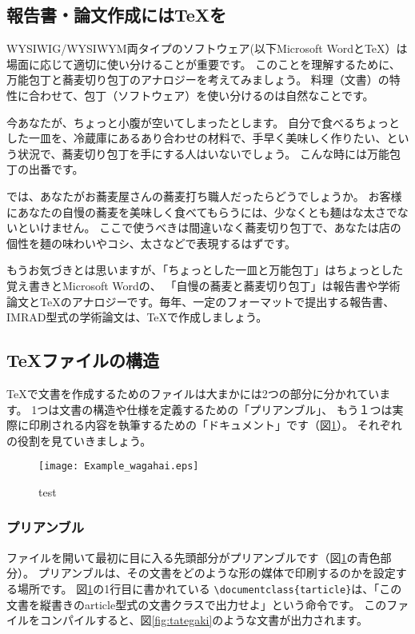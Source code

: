 \documentclass[TeXworkshop]{subfiles}
\begin{document}
\subsection{報告書・論文作成には\TeX を}
WYSIWIG/WYSIWYM両タイプのソフトウェア(以下Microsoft Wordと\TeX）は場面に応じて適切に使い分けることが重要です。
このことを理解するために、万能包丁と蕎麦切り包丁のアナロジーを考えてみましょう。
料理（文書）の特性に合わせて、包丁（ソフトウェア）を使い分けるのは自然なことです。

今あなたが、ちょっと小腹が空いてしまったとします。
自分で食べるちょっとした一皿を、冷蔵庫にあるあり合わせの材料で、手早く美味しく作りたい、という状況で、蕎麦切り包丁を手にする人はいないでしょう。
こんな時には万能包丁の出番です。

では、あなたがお蕎麦屋さんの蕎麦打ち職人だったらどうでしょうか。
お客様にあなたの自慢の蕎麦を美味しく食べてもらうには、少なくとも麺はな太さでないといけません。
ここで使うべきは間違いなく蕎麦切り包丁で、あなたは店の個性を麺の味わいやコシ、太さなどで表現するはずです。

もうお気づきとは思いますが、「ちょっとした一皿と万能包丁」はちょっとした覚え書きとMicrosoft Wordの、
「自慢の蕎麦と蕎麦切り包丁」は報告書や学術論文と\TeX のアナロジーです。毎年、一定のフォーマットで提出する報告書、IMRAD型式の学術論文は、\TeX で作成しましょう。

\subsection{\TeX ファイルの構造}
\TeX で文書を作成するためのファイルは大まかには2つの部分に分かれています。
1つは文書の構造や仕様を定義するための「プリアンブル」、
もう１つは実際に印刷される内容を執筆するための「ドキュメント」です（図\ref{fig:example_wagahai}）。
それぞれの役割を見ていきましょう。

\begin{figure}[H]
\begin{center}
\texttt{[image: Example\_wagahai.eps]}
\caption{test}\label{fig:example_wagahai}
\end{center}
\end{figure}

\subsubsection{プリアンブル}
ファイルを開いて最初に目に入る先頭部分がプリアンブルです（図\ref{fig:example_wagahai}の青色部分）。
プリアンブルは、その文書をどのような形の媒体で印刷するのかを設定する場所です。
図\ref{fig:example_wagahai}の1行目に書かれている
\verb|\documentclass{tarticle}|は、「この文書を縦書きのarticle型式の文書クラスで出力せよ」という命令です。
このファイルをコンパイルすると、図\ref{fig:tategaki}のような文書が出力されます。
\end{document}
